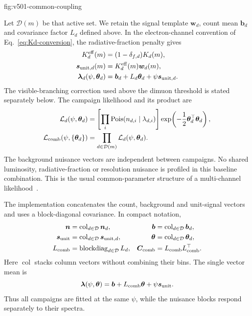 {fig:v501-common-coupling}

Let $\mathcal D(m)$ be that active set. We retain the signal template
$\bm w_d$, count mean $\bm b_d$ and covariance factor $L_d$ defined above.
In the electron-channel convention of Eq.~\eqref{eq:Kd-conversion}, the
radiative-fraction penalty gives
\begin{align}
 K_d^{\rm eff}(m)&=(1-\delta_{f,d})K_d(m),
 \label{eq:kdeff}\\
 \bm s_{{\rm unit},d}(m)&=K_d^{\rm eff}(m)\bm w_d(m),\\
 \bm\lambda_d(\psi,\bm\theta_d)
 &=\bm b_d+L_d\bm\theta_d+\psi\bm s_{{\rm unit},d}.
 \label{eq:v501-combined-mean}
\end{align}
The visible-branching correction used above the dimuon threshold is stated
separately below. The campaign likelihood and its product are
\begin{align}
 \mathcal L_d(\psi,\bm\theta_d)
 &=\left[\prod_i\operatorname{Pois}(n_{d,i}\mid\lambda_{d,i})\right]
   \exp\!\left(-\frac12\bm\theta_d^\top\bm\theta_d\right),
 \label{eq:dataset-poi-like}\\
 \mathcal L_{\rm comb}(\psi,\{\bm\theta_d\})
 &=\prod_{d\in\mathcal D(m)}\mathcal L_d(\psi,\bm\theta_d).
 \label{eq:combinedlike-product}
\end{align}
The background nuisance vectors are independent between campaigns. No
shared luminosity, radiative-fraction or resolution nuisance is profiled
in this baseline combination. This is the usual common-parameter structure
of a multi-channel likelihood~\cite{HistFactory,ATLASCMSHiggs2016}.

The implementation concatenates the count, background and unit-signal
vectors and uses a block-diagonal covariance. In compact notation,
\begin{align}
 \bm n&=\operatorname{col}_{d\in\mathcal D}\bm n_d,
 &\bm b&=\operatorname{col}_{d\in\mathcal D}\bm b_d,\\
 \bm s_{\rm unit}&=\operatorname{col}_{d\in\mathcal D}\bm s_{{\rm unit},d},
 &\bm\theta&=\operatorname{col}_{d\in\mathcal D}\bm\theta_d,\\
 L_{\rm comb}&=\operatorname{blockdiag}_{d\in\mathcal D}L_d,
 &\bm C_{\rm comb}&=L_{\rm comb}L_{\rm comb}^\top.
\end{align}
Here $\operatorname{col}$ stacks column vectors without combining their
bins. The single vector mean is
\begin{equation}
 \bm\lambda(\psi,\bm\theta)
 =\bm b+L_{\rm comb}\bm\theta+\psi\bm s_{\rm unit}.
\end{equation}
Thus all campaigns are fitted at the same $\psi$, while the nuisance blocks
respond separately to their spectra.

